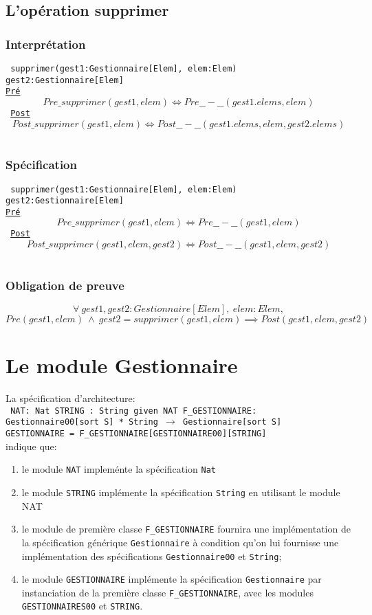 \documentclass{article}
\begin{document}
\subsection{L'opération supprimer}
\subsubsection{Interprétation}
{\tt
supprimer(gest1:Gestionnaire[Elem], elem:Elem) gest2:Gestionnaire[Elem]\\
\underline{Pré}
$$ Pre\_supprimer(gest1,elem) \Leftrightarrow Pre\_\_-\_\_(gest1.elems,elem) $$
\underline{Post}
$$ Post\_supprimer(gest1,elem) \Leftrightarrow Post\_\_-\_\_(gest1.elems,elem,gest2.elems) $$
}

\subsubsection{Spécification}
{\tt
supprimer(gest1:Gestionnaire[Elem], elem:Elem) gest2:Gestionnaire[Elem]\\
\underline{Pré}
$$ Pre\_supprimer(gest1,elem) \Leftrightarrow Pre\_\_-\_\_(gest1,elem) $$
\underline{Post}
$$ Post\_supprimer(gest1,elem,gest2) \Leftrightarrow Post\_\_-\_\_(gest1,elem,gest2) $$
}

\subsubsection{Obligation de preuve}
$$ \forall\ gest1,gest2:Gestionnaire[Elem],\ elem:Elem,$$
$$ Pre(gest1,elem)\ \wedge\ gest2 = supprimer(gest1,elem) \implies Post(gest1,elem,gest2)$$

\section{Le module Gestionnaire}
La spécification d'architecture:\\
{\tt
NAT: Nat
STRING : String given NAT
F\_GESTIONNAIRE: Gestionnaire00[sort S] * String $\rightarrow$ Gestionnaire[sort S]\\
GESTIONNAIRE = F\_GESTIONNAIRE[GESTIONNAIRE00][STRING]\\
}
indique que:
\begin{enumerate}
\item le module \texttt{NAT} impleménte la spécification \texttt{Nat}
\item le module \texttt{STRING} implémente la spécification \texttt{String} en utilisant le module NAT
\item le module de première classe \texttt{F\_GESTIONNAIRE} fournira une implémentation de la spécification générique \texttt{Gestionnaire} à condition qu'on lui fournisse une implémentation des spécifications \texttt{Gestionnaire00} et \texttt{String};
\item le module \texttt{GESTIONNAIRE} implémente la spécification \texttt{Gestionnaire} par instanciation de la première classe \texttt{F\_GESTIONNAIRE}, avec les modules \texttt{GESTIONNAIRES00} et \texttt{STRING}.
\end{enumerate}
\end{document}
